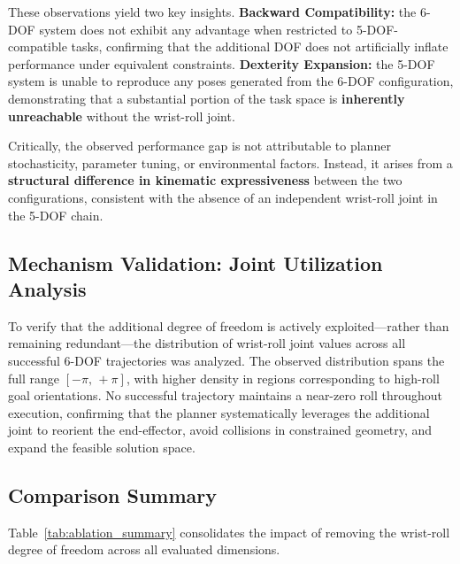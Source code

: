 \documentclass[conference]{IEEEtran}
\begin{document}
	These observations yield two key insights. \textbf{Backward
		Compatibility:} the 6-DOF system does not exhibit any advantage when
	restricted to 5-DOF-compatible tasks, confirming that the additional
	DOF does not artificially inflate performance under equivalent
	constraints. \textbf{Dexterity Expansion:} the 5-DOF system is unable
	to reproduce any poses generated from the 6-DOF configuration,
	demonstrating that a substantial portion of the task space is
	\textbf{inherently unreachable} without the wrist-roll joint.
	
	Critically, the observed performance gap is not attributable to
	planner stochasticity, parameter tuning, or environmental factors.
	Instead, it arises from a \textbf{structural difference in kinematic
		expressiveness} between the two configurations, consistent with the
	absence of an independent wrist-roll joint in the 5-DOF chain.
	
	\subsection{Mechanism Validation: Joint Utilization Analysis}
	
	To verify that the additional degree of freedom is actively
	exploited---rather than remaining redundant---the distribution of
	wrist-roll joint values across all successful 6-DOF trajectories was
	analyzed. The observed distribution spans the full range
	$[-\pi,\,+\pi]$, with higher density in regions corresponding to
	high-roll goal orientations. No successful trajectory maintains a
	near-zero roll throughout execution, confirming that the planner
	systematically leverages the additional joint to reorient the
	end-effector, avoid collisions in constrained geometry, and expand the
	feasible solution space.
	
	\subsection{Comparison Summary}
	
	Table~\ref{tab:ablation_summary} consolidates the impact of removing
	the wrist-roll degree of freedom across all evaluated dimensions.
	
\end{document}

